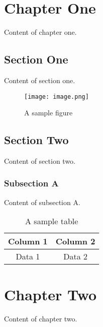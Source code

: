 \documentclass{book}
\begin{document}
   
   \chapter{Chapter One}
      Content of chapter one.
      
   \section{Section One}
      Content of section one.
      
      \begin{figure}
         \centering
         \texttt{[image: image.png]}
         \caption{A sample figure}
         \label{fig:sample}
      \end{figure}
      
   \section{Section Two}
      Content of section two.
      
      \subsection{Subsection A}
         Content of subsection A.
         
         \begin{table}
            \centering
            \begin{tabular}{|c|c|}
               \hline
               Column 1 & Column 2 \\
               \hline
               Data 1 & Data 2 \\
               \hline
            \end{tabular}
            \caption{A sample table}
         \end{table}
         
   \chapter{Chapter Two}
      Content of chapter two.
      
\end{document}
